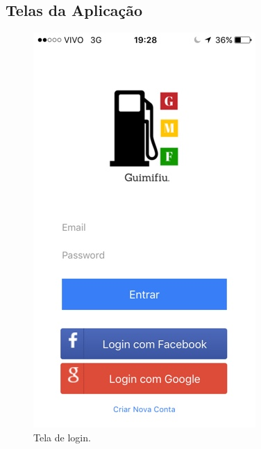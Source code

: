 \begin{anexosenv}

\partanexos

\chapter{Telas da Aplicação}
\label{chap:telas}

\begin{figure}[H]
    \centering
    \includegraphics[scale=0.5]{figuras/app_1.jpg}
    \caption[Tela de login]{Tela de login.}
    \label{img:tela_de_login}
\end{figure}


\end{anexosenv}

